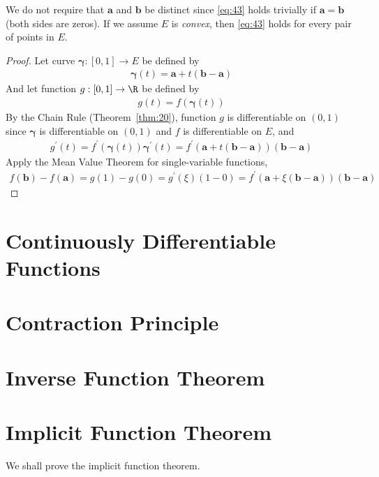 \documentclass[thmcnt=section, 12pt]{elegantbook}
\begin{document}
\begin{remark}
    We do not require that $\mathbf{a}$ and $\mathbf{b}$ be distinct since \eqref{eq:43} holds trivially if $\mathbf{a} = \mathbf{b}$ (both sides are zeros). If we assume $E$ is \textit{convex}, then \eqref{eq:43} holds for every pair of points in $E$.
\end{remark}

\begin{proof}
    Let curve $\boldsymbol{\gamma}: [0,1] \to E$ be defined by 
    \begin{align*}
        \boldsymbol{\gamma}(t) = \mathbf{a} + t (\mathbf{b} - \mathbf{a})
    \end{align*}
    And let function $g: [0,1] \to \R$ be defined by 
    \begin{align*}
        g(t) = f(\boldsymbol{\gamma}(t))
    \end{align*}
    By the Chain Rule (Theorem~\ref{thm:20}), function $g$ is differentiable on $(0,1)$ since $\boldsymbol{\gamma}$ is differentiable on $(0,1)$ and $f$ is differentiable on $E$, and 
    \begin{align*}
        g^\prime(t) 
        = f^\prime(\boldsymbol{\gamma}(t)) \boldsymbol{\gamma}^\prime(t)
        = f^\prime(\mathbf{a} + t (\mathbf{b} - \mathbf{a})) (\mathbf{b} - \mathbf{a})
    \end{align*}
    Apply the Mean Value Theorem for single-variable functions, 
    \begin{align*}
        f(\mathbf{b}) - f(\mathbf{a}) = g(1) - g(0) = g^\prime(\xi) (1 - 0)
        = f^\prime(\mathbf{a} + \xi (\mathbf{b} - \mathbf{a})) (\mathbf{b} - \mathbf{a})
    \end{align*}
\end{proof}


\section{Continuously Differentiable Functions}


\section{Contraction Principle}


\section{Inverse Function Theorem}


\section{Implicit Function Theorem}

\par We shall prove the implicit function theorem.

\end{document}

